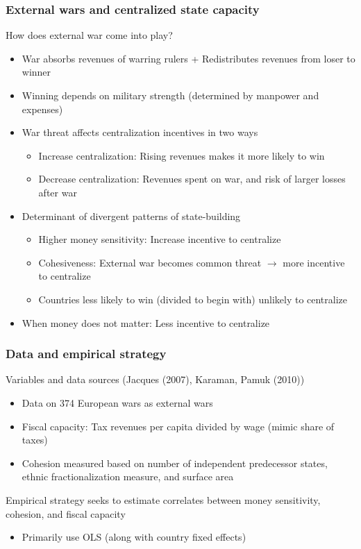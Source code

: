 \documentclass[aspectratio=169]{beamer}
\begin{document}
\begin{frame}
\frametitle{External wars and centralized state capacity} 
How does external war come into play?
\begin{itemize}\setlength\itemsep{3pt}
\item War absorbs revenues of warring rulers + Redistributes revenues from loser to winner
\item Winning depends on military strength (determined by manpower and expenses)
\item War threat affects centralization incentives in two ways
\begin{itemize}\setlength\itemsep{3pt}
\item Increase centralization: Rising revenues makes it more likely to win 
\item Decrease centralization: Revenues spent on war, and risk of larger losses after war 
\end{itemize}
\item Determinant of divergent patterns of state-building
\begin{itemize}\setlength\itemsep{3pt}
\item Higher money sensitivity: Increase incentive to centralize
\item Cohesiveness: External war becomes common threat $\to$ more incentive to centralize
\item Countries less likely to win (divided to begin with) unlikely to centralize 
\end{itemize}
\item When money does not matter: Less incentive to centralize 
 \end{itemize}
\end{frame}

\begin{frame}
\frametitle{Data and empirical strategy} 
Variables and data sources (Jacques (2007), Karaman, Pamuk (2010))
\begin{itemize}\setlength\itemsep{3pt}
\item Data on 374 European wars as external wars
\item Fiscal capacity: Tax revenues per capita divided by wage (mimic share of taxes)
\item Cohesion measured based on number of independent predecessor states, ethnic fractionalization measure, and surface area
\end{itemize}\medskip
Empirical strategy seeks to estimate correlates between money sensitivity, cohesion, and fiscal capacity
\begin{itemize}\setlength\itemsep{3pt}
\item Primarily use OLS (along with country fixed effects)

\end{itemize}\medskip

\end{frame}
\end{document}
